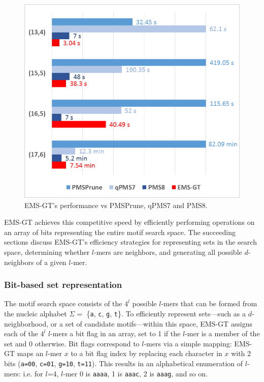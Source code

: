 \documentclass[oneside,12pt]{DISCSthesis}
\begin{document}
		\begin{figure}[h]\label{fig:emsgt_vs_pmsprune_qpms7_pms8}
			\centering
			\includegraphics{img/emsgt-vs-pmsprune,qpms7,pms8}
			\caption{EMS-GT's performance vs PMSPrune, qPMS7 and PMS8.}
			\end{figure}

		EMS-GT achieves this competitive speed by efficiently performing operations on an array of bits representing the entire motif search space. The succeeding sections discuss EMS-GT's efficiency strategies for representing sets in the search space, determining whether $l$-mers are neighbors, and generating all possible $d$-neighbors of a given $l$-mer.

		\subsubsection{Bit-based set representation}
			The motif search space consists of the $4^{l}$ possible $l$-mers that can be formed from the nucleic alphabet $\Sigma=$ \{\texttt{a}, \texttt{c}, \texttt{g}, \texttt{t}\}. To efficiently represent sets---such as a $d$-neighborhood, or a set of candidate motifs---within this space, EMS-GT assigns each of the $4^{l}$ $l$-mers a bit flag in an array, set to 1 if the $l$-mer is a member of the set and 0 otherwise. Bit flags correspond to $l$-mers via a simple mapping: EMS-GT maps an $l$-mer $x$ to a bit flag index by replacing each character in $x$ with 2 bits (\texttt{a=00}, \texttt{c=01}, \texttt{g=10}, \texttt{t=11}). This results in an alphabetical enumeration of $l$-mers: i.e. for $l$=4, $l$-mer 0 is \texttt{aaaa}, 1 is \texttt{aaac}, 2 is \texttt{aaag}, and so on.\vspace*{3mm}
\end{document}
